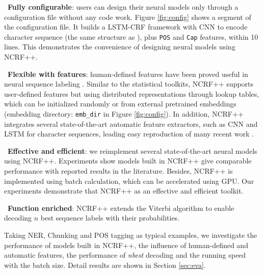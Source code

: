 \documentclass[11pt,a4paper]{article}
\begin{document}
\noindent \textbullet $\,$ \textbf{Fully configurable}: users can design their neural models only through a configuration file without any code work. Figure \ref{fig:config} shows a segment of the configuration file. It builds a LSTM-CRF framework with CNN to encode character sequence (the same structure as ), plus \texttt{POS} and \texttt{Cap} features, within 10 lines. This demonstrates the convenience of designing neural models using NCRF++.

\noindent \textbullet $\,$ \textbf{Flexible with features}: human-defined features have been proved useful in neural sequence labeling \cite{collobert2011natural,chiu2015named}. Similar to the statistical toolkits, NCRF++ supports user-defined features but using distributed representations through lookup tables, which can be initialized randomly or from external pretrained embeddings (embedding directory: \texttt{emb\_dir} in Figure \ref{fig:config}). In addition, NCRF++ integrates several state-of-the-art automatic feature extractors, such as CNN and LSTM for character sequences, leading easy reproduction of many recent work \cite{lample2016neural,chiu2015named,ma2016end}.

\noindent \textbullet $\,$ \textbf{Effective and efficient}: we reimplement several state-of-the-art neural models \cite{lample2016neural,ma2016end} using NCRF++. Experiments show models built in NCRF++ give comparable performance with reported results in the literature. Besides, NCRF++ is implemented using batch calculation, which can be accelerated using GPU. Our experiments demonstrate that NCRF++ as an effective and efficient toolkit.

\noindent \textbullet $\,$ \textbf{Function enriched}: NCRF++ extends the Viterbi algorithm \cite{viterbi1967error} to enable decoding $n$ best sequence labels with their probabilities.

Taking NER, Chunking and POS tagging as typical examples, we investigate the performance of models built in NCRF++, the influence of human-defined and automatic features, the performance of \textit{nbest} decoding and the running speed with the batch size. Detail results are shown in Section \ref{sec:eva}.
\end{document}
